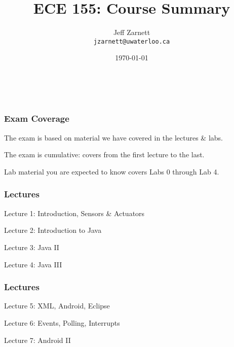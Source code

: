 
\usepackage{tikz-3dplot}

\title{ECE 155: Course Summary}

\author{Jeff Zarnett \\ \small \texttt{jzarnett@uwaterloo.ca}}
\date{\today}



\begin{frame}
  \titlepage

  \vfill
  \begin{center}
    \\
                  {\tiny\CcNote{\CcLongnameByNcSa}}
                  \vspace*{-2.5ex}
  \end{center}

\end{frame}


\begin{frame}
\frametitle{Exam Coverage}

The exam is based on material we have covered in the lectures \& labs.

The exam is cumulative: covers from the first lecture to the last.

Lab material you are expected to know covers Labs 0 through Lab 4.

\end{frame}


\begin{frame}
\frametitle{Lectures}

{\LARGE
Lecture 1: Introduction, Sensors \& Actuators

Lecture 2: Introduction to Java

Lecture 3: Java II

Lecture 4: Java III}

\end{frame}

\begin{frame}
\frametitle{Lectures}

{\LARGE

Lecture 5: XML, Android, Eclipse

Lecture 6: Events, Polling, Interrupts

Lecture 7: Android II

}

\end{frame}


